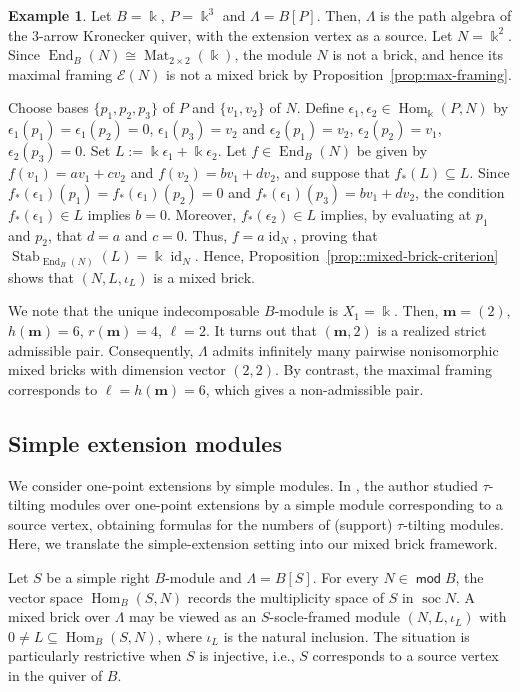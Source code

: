 \documentclass[a4,12pt]{amsart}
\numberwithin{equation}{section} %
\def\Hom{\operatorname{Hom}} %
\def\End{\operatorname{End}} %
\def\soc{\operatorname{soc}} %
\def\Stab{\operatorname{Stab}} %
\def\mod{\operatorname{\mathsf{mod}}}
\theoremstyle{definition} %
\newtheorem{example}[theorem]{Example} %
\begin{document}
\begin{example}
Let $B=\Bbbk$, $P=\Bbbk^3$ and $\Lambda=B[P]$. Then, $\Lambda$ is the path algebra of the 3-arrow Kronecker quiver, with the extension vertex as a source. Let $N=\Bbbk^2$. Since $\End_B(N)\cong\operatorname{Mat}_{2\times2}(\Bbbk)$, the module $N$ is not a brick, and hence its maximal framing $\mathcal{E}(N)$ is not a mixed brick by Proposition~\ref{prop:max-framing}. 

Choose bases $\{p_1,p_2,p_3\}$ of $P$ and $\{v_1,v_2\}$ of $N$. Define
$\epsilon_1,\epsilon_2\in\Hom_{\Bbbk}(P,N)$ by $\epsilon_1(p_1)=\epsilon_1(p_2)=0$, $\epsilon_1(p_3)=v_2$ and $\epsilon_2(p_1)=v_2$, $\epsilon_2(p_2)=v_1$, $\epsilon_2(p_3)=0$. Set $L:=\Bbbk\epsilon_1+\Bbbk\epsilon_2$. Let $f\in\End_B(N)$ be given by
$f(v_1)=av_1+cv_2$ and $f(v_2)=bv_1+dv_2$, and suppose that
$f_*(L)\subseteq L$. Since $f_*(\epsilon_1)(p_1)=f_*(\epsilon_1)(p_2)=0$ and $f_*(\epsilon_1)(p_3)=bv_1+dv_2$, the condition $f_*(\epsilon_1)\in L$ implies $b=0$. Moreover, $f_*(\epsilon_2)\in L$ implies, by evaluating at $p_1$ and $p_2$, that $d=a$ and $c=0$. Thus, $f=a\operatorname{id}_{N}$, proving that $\Stab_{\End_B(N)}(L)=\Bbbk\operatorname{id}_{N}$. Hence, Proposition~\ref{prop::mixed-brick-criterion} shows that $(N,L,\iota_L)$ is a mixed brick.

We note that the unique indecomposable $B$-module is $X_1=\Bbbk$. Then,  $\mathbf{m}=(2)$, $h(\mathbf{m})=6$, $r(\mathbf{m})=4$, $\ell=2$. It turns out that $(\mathbf{m},2)$ is a realized strict admissible pair. Consequently, $\Lambda$ admits infinitely many pairwise nonisomorphic mixed bricks with dimension vector $(2,2)$. By contrast, the maximal framing corresponds to $\ell=h(\mathbf{m})=6$, which gives a non-admissible pair.
\end{example}

\subsection{Simple extension modules}
We consider one-point extensions by simple modules. In \cite{Gao-simple-one-point}, the author studied $\tau$-tilting modules over one-point extensions by a simple module corresponding to a source vertex, obtaining formulas for the numbers of (support) $\tau$-tilting modules. Here, we translate the simple-extension setting into our mixed brick framework.

Let $S$ be a simple right $B$-module and $\Lambda=B[S]$. For every $N\in\mod B$, the vector space $\Hom_B(S,N)$ records the multiplicity space of $S$ in $\soc N$. A mixed brick over $\Lambda$ may be viewed as an $S$-socle-framed module $(N,L,\iota_L)$ with $0\neq L\subseteq\Hom_B(S,N)$, where $\iota_L$ is the natural inclusion. The situation is particularly restrictive when $S$ is injective, i.e., $S$ corresponds to a source vertex in the quiver of $B$.
\end{document}
